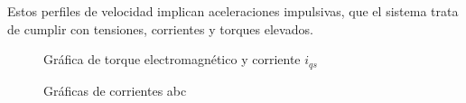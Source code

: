 \documentclass[a4paper, 10pt, onecolumn,journal]{ieeeconf}
\begin{document}
Estos perfiles de velocidad implican aceleraciones impulsivas, que el sistema trata de cumplir con tensiones, corrientes y torques elevados.
\begin{figure}[H]
	\centering
	\begin{adjustbox}{max width=\columnwidth}
	\end{adjustbox}
	\caption{Gráfica de torque electromagnético y corriente $i_{qs}$}
	\label{Gráfica de torque electromagnético y corriente $i_{qs}$}
\end{figure}

\begin{figure}[H]
	\centering
	\begin{adjustbox}{max width=\columnwidth}
	\end{adjustbox}
	\caption{Gráficas de corrientes abc}
	\label{Gráficas de corrientes $i_{abc}$}
\end{figure}
\end{document}
